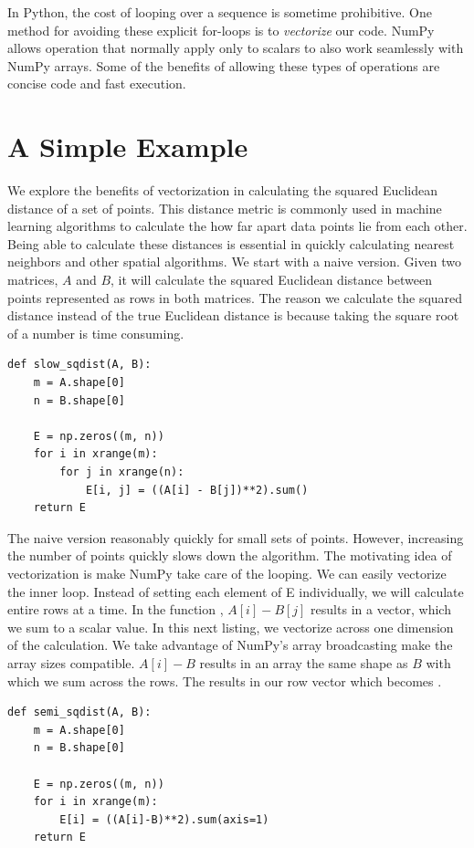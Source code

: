 \label{lab:Python_Vectorization}

In Python, the cost of looping over a sequence is sometime prohibitive.
One method for avoiding these explicit for-loops is to \emph{vectorize} our code.
NumPy allows operation that normally apply only to scalars to also work seamlessly with NumPy arrays.
Some of the benefits of allowing these types of operations are concise code and fast execution.

\section*{A Simple Example}
We explore the benefits of vectorization in calculating the squared Euclidean distance of a set of points.
This distance metric is commonly used in machine learning algorithms to calculate the how far apart data points lie from each other.
Being able to calculate these distances is essential in quickly calculating nearest neighbors and other spatial algorithms.
We start with a naive version.  Given two matrices, $A$ and $B$, it will calculate the squared Euclidean distance between points
represented as rows in both matrices.  The reason we calculate the squared distance instead of the true Euclidean distance is because
taking the square root of a number is time consuming.
\begin{lstlisting}
def slow_sqdist(A, B):
    m = A.shape[0]
    n = B.shape[0]
    
    E = np.zeros((m, n))
    for i in xrange(m):
        for j in xrange(n):
            E[i, j] = ((A[i] - B[j])**2).sum()
    return E
\end{lstlisting}
The naive version reasonably quickly for small sets of points.  However, increasing the number of points quickly slows down the algorithm.
The motivating idea of vectorization is make NumPy take care of the looping.  
We can easily vectorize the inner loop.  Instead of setting each element of E individually, we will calculate entire rows at a time.
In the function , $A[i]-B[j]$ results in a vector, which we sum to a scalar value.
In this next listing, we vectorize across one dimension of the calculation.
We take advantage of NumPy's array broadcasting make the array sizes compatible.
$A[i]-B$ results in an array the same shape as $B$ with which we sum across the rows.  The results in our row vector which becomes .
\begin{lstlisting}
def semi_sqdist(A, B):
    m = A.shape[0]
    n = B.shape[0]

    E = np.zeros((m, n))
    for i in xrange(m):
        E[i] = ((A[i]-B)**2).sum(axis=1)
    return E
\end{lstlisting}

